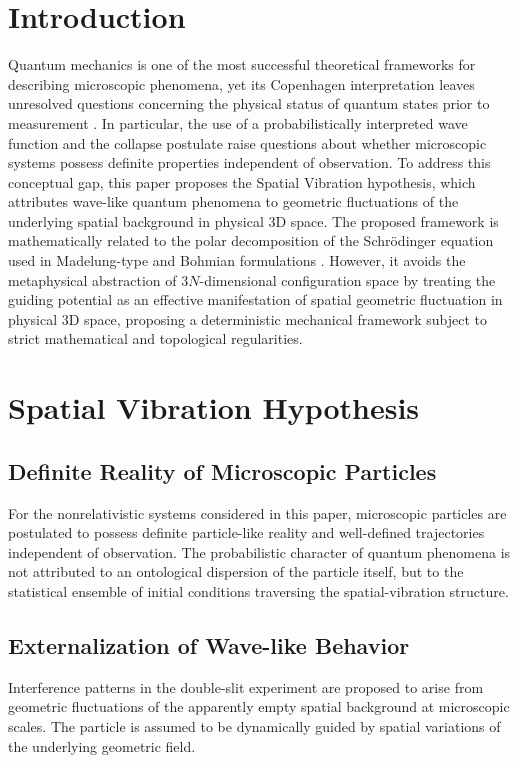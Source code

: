 \documentclass[reprint,amsmath,amssymb,aps,prd]{revtex4-2}
\begin{document}
\maketitle

\section{Introduction}
Quantum mechanics is one of the most successful theoretical frameworks for describing microscopic phenomena, yet its Copenhagen interpretation leaves unresolved questions concerning the physical status of quantum states prior to measurement \cite{Einstein1935}.
In particular, the use of a probabilistically interpreted wave function and the collapse postulate raise questions about whether microscopic systems possess definite properties independent of observation.
To address this conceptual gap, this paper proposes the Spatial Vibration hypothesis, which attributes wave-like quantum phenomena to geometric fluctuations of the underlying spatial background in physical 3D space.
The proposed framework is mathematically related to the polar decomposition of the Schr\"{o}dinger equation used in Madelung-type and Bohmian formulations \cite{Madelung1927, Bohm1952}. However, it avoids the metaphysical abstraction of $3N$-dimensional configuration space by treating the guiding potential as an effective manifestation of spatial geometric fluctuation in physical 3D space, proposing a deterministic mechanical framework subject to strict mathematical and topological regularities.

\section{Spatial Vibration Hypothesis}

\subsection{Definite Reality of Microscopic Particles}
For the nonrelativistic systems considered in this paper, microscopic particles are postulated to possess definite particle-like reality and well-defined trajectories independent of observation. The probabilistic character of quantum phenomena is not attributed to an ontological dispersion of the particle itself, but to the statistical ensemble of initial conditions traversing the spatial-vibration structure.
\subsection{Externalization of Wave-like Behavior}
Interference patterns in the double-slit experiment are proposed to arise from geometric fluctuations of the apparently empty spatial background at microscopic scales.
The particle is assumed to be dynamically guided by spatial variations of the underlying geometric field.
\end{document}
